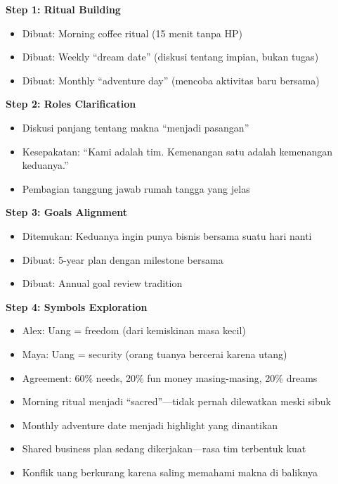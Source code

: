 \begin{praktikbox}
\textbf{Step 1: Ritual Building}
\begin{itemize}
    \item Dibuat: Morning coffee ritual (15 menit tanpa HP)
    \item Dibuat: Weekly ``dream date'' (diskusi tentang impian, bukan tugas)
    \item Dibuat: Monthly ``adventure day'' (mencoba aktivitas baru bersama)
\end{itemize}

\textbf{Step 2: Roles Clarification}
\begin{itemize}
    \item Diskusi panjang tentang makna ``menjadi pasangan''
    \item Kesepakatan: ``Kami adalah tim. Kemenangan satu adalah kemenangan keduanya.''
    \item Pembagian tanggung jawab rumah tangga yang jelas
\end{itemize}

\textbf{Step 3: Goals Alignment}
\begin{itemize}
    \item Ditemukan: Keduanya ingin punya bisnis bersama suatu hari nanti
    \item Dibuat: 5-year plan dengan milestone bersama
    \item Dibuat: Annual goal review tradition
\end{itemize}

\textbf{Step 4: Symbols Exploration}
\begin{itemize}
    \item Alex: Uang = freedom (dari kemiskinan masa kecil)
    \item Maya: Uang = security (orang tuanya bercerai karena utang)
    \item Agreement: 60\% needs, 20\% fun money masing-masing, 20\% dreams
\end{itemize}
\end{praktikbox}

\begin{praktikbox}
\begin{itemize}
    \item Morning ritual menjadi ``sacred''---tidak pernah dilewatkan meski sibuk
    \item Monthly adventure date menjadi highlight yang dinantikan
    \item Shared business plan sedang dikerjakan---rasa tim terbentuk kuat
    \item Konflik uang berkurang karena saling memahami makna di baliknya
\end{itemize}
\end{praktikbox}

